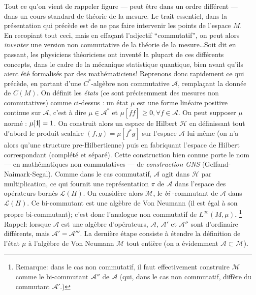 Tout ce qu'on vient de rappeler figure --- peut \^etre dans un ordre 
diff\'erent --- dans un cours standard de 
th\'eorie de la mesure. Le trait essentiel, dans la pr\'esentation qui 
pr\'ec\`ede est de ne pas faire intervenir les points de l'espace $M$.
En recopiant tout ceci, mais en effa\c cant l'adjectif 
``commutatif'', on peut alors {\it inventer\/} une version non 
commutative de la th\'eorie de la 
mesure\ldots Soit dit en passant, les physiciens 
th\'eoriciens ont invent\'e la plupart de ces diff\'erents concepts, dans le cadre de la m\'ecanique 
statistique quantique, bien avant qu'ils aient \'et\'e formalis\'es par 
des  math\'ematiciens!
Reprenons donc rapidement ce qui pr\'ec\`ede, en partant d'une $C^{*}$-alg\`ebre non 
commutative ${\mathcal A}$, rempla\c cant la donn\'ee de $C(M)$.
On d\'efinit les {\sl \'etats \/}  (ce sont pr\'ecisemment des mesures non 
commutatives) comme ci-dessus : un \'etat $\mu$ est une forme lin\'eaire 
positive continue sur ${\mathcal A}$, c'est \`a dire $\mu \in {\mathcal 
A}^{*}$ et $\mu[\overline{f}f] \geq 0, \forall f \in {\mathcal A}$. On 
peut supposer $\mu$ norm\'e : $\mu[\mbox{\rm 1}\hskip-3pt \mbox{\rm l}]=1$. On construit alors un 
espace de Hilbert ${\mathcal H}$ en d\'efinissant tout d'abord le 
produit scalaire $(f,g)  =  \mu[f^{*}g]$ sur l'espace ${\mathcal A}$ 
lui-m\^eme (on n'a alors qu'une structure pre-Hilbertienne) puis en 
fabriquant l'espace de Hilbert correspondant (compl\'et\'e et s\'epar\'e). 
Cette construction bien connue porte le nom --- en math\'ematiques non 
commutatives --- de {\sl construction GNS\/} 
(Gelfand-Naimark-Segal). 
Comme dans le cas commutatif, ${\mathcal A}$ agit dans ${\mathcal H}$ 
par multiplication, ce qui fournit une repr\'esentation $\pi$ de ${\mathcal 
A}$  dans l'espace des op\'erateurs born\'es ${\mathcal L(H)}$. On 
consid\`ere alors ${\mathcal M}$,  le {\it bi \/}-commutant de ${\mathcal 
A}$ dans ${\mathcal L(H)}$. Ce bi-commutant est une alg\`ebre de Von 
Neumann (il est \'egal \`a son propre bi-commutant); c'est donc l'analogue non 
commutatif de $L^\infty(M,\mu)$. \footnote{Remarque: dans le cas non commutatif, 
il faut effectivement construire ${\mathcal M}$ comme le bi-commutant ${\mathcal A}''$
de ${\mathcal A}$ (qui, dans le cas non commutatif, diff\`ere du 
commutant ${\mathcal A}'.$)} Rappel: lorsque ${\mathcal A}$ est une alg\`ebre 
d'op\'erateurs, ${\mathcal A}$, ${\mathcal A}'$ et ${\mathcal A}''$ 
sont d'ordinaire diff\'erents, mais ${\mathcal A}' = {\mathcal A}'''$.
La derni\`ere \'etape consiste \`a \'etendre la d\'efinition de l'\'etat $\mu$ \`a 
l'alg\`ebre de Von Neumann ${\mathcal M}$ tout enti\`ere (on a \'evidemment ${\mathcal 
A} \subset {\mathcal M}$). 

